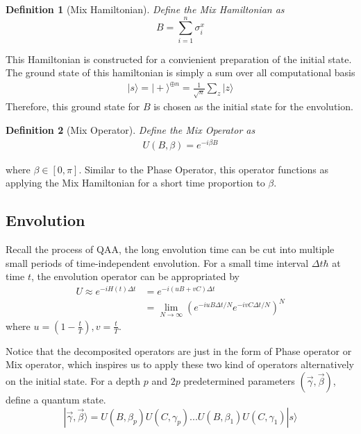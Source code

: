 \documentclass{./source/Report}
\newtheorem{definition}{Definition}
\begin{document}
\begin{definition}[Mix Hamiltonian]
Define the Mix Hamiltonian as 
\begin{equation}
    B=\sum_{i=1}^n\sigma_i^x
\end{equation}
\end{definition}
This Hamiltonian is constructed for a convienient preparation of the initial state. 
The ground state of this hamiltonian is simply a sum over all computational basis
\begin{align*}
    |s\rangle = |+\rangle^{\oplus n}=\frac{1}{\sqrt{n}}\sum_z |z\rangle
\end{align*} 
Therefore, this ground state for $B$ is chosen as the initial state for the envolution.

\begin{definition}[Mix Operator]
Define the Mix Operator as 
\begin{align*}
    U(B, \beta)=e^{-i\beta B}
\end{align*} 
\end{definition}
where $\beta \in [0, \pi]$. Similar to the Phase Operator, this operator functions 
as applying the Mix Hamiltonian for a short time proportion to $\beta$. 

\subsection{Envolution}

Recall the process of QAA, the long envolution time can 
be cut into multiple small periods of time-independent envolution.
For a small time interval $\Delta t \hbar$ at time $t$, the envolution operator 
can be appropriated by 
\begin{equation}
    \begin{aligned}
   U \approx e^{-iH(t)\Delta t} &= e^{-i(uB+vC)\Delta t} \\
   &= \lim_{N\rightarrow \infty}(e^{-iuB\Delta t/N}e^{-ivC\Delta t/N})^N
    \end{aligned}
\end{equation}
where $u=(1-\frac{t}{T}), v=\frac{t}{T}$. 

Notice that the decomposited operators are just 
in the form of Phase operator or Mix operator, which inspires us to apply these two kind of 
operators alternatively on the initial state. For a depth $p$ and $2p$ predetermined parameters 
$(\vec{\gamma}, \vec{\beta})$, define a quantum state.
\begin{equation}
    |\vec{\gamma}, \vec{\beta}\rangle=U(B,\beta_p)U(C,\gamma_p)...U(B,\beta_1)U(C,\gamma_1)|s\rangle 
\end{equation}
\end{document}
